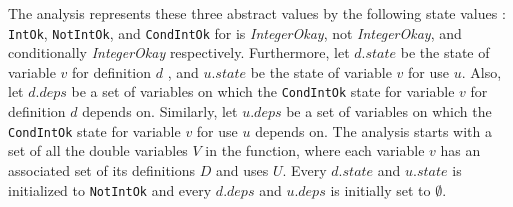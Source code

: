 The analysis represents these three abstract values by the following state
values : \texttt{IntOk}, \texttt{NotIntOk}, and \texttt{CondIntOk} for is
\emph{IntegerOkay}, not \emph{IntegerOkay}, and conditionally
\emph{IntegerOkay} respectively.  Furthermore, let $d.state$ be the state
of variable $v$ for definition $d$ , and $u.state$ be the state of
variable $v$ for use $u$. Also, let $d.deps$ be a set of variables on
which the \texttt{CondIntOk} state for variable $v$ for definition $d$ depends on.
Similarly, let $u.deps$ be a set of variables on which the \texttt{CondIntOk}
state for variable $v$ for use $u$ depends on. The analysis starts with a set of
all the double variables $V$ in the \matlab function, where each variable $v$
has an associated set of its definitions $D$ and uses $U$. Every $d.state$ and
$u.state$ is initialized to \texttt{NotIntOk} and every $d.deps$ and $u.deps$ is
initially set to $\emptyset$.

